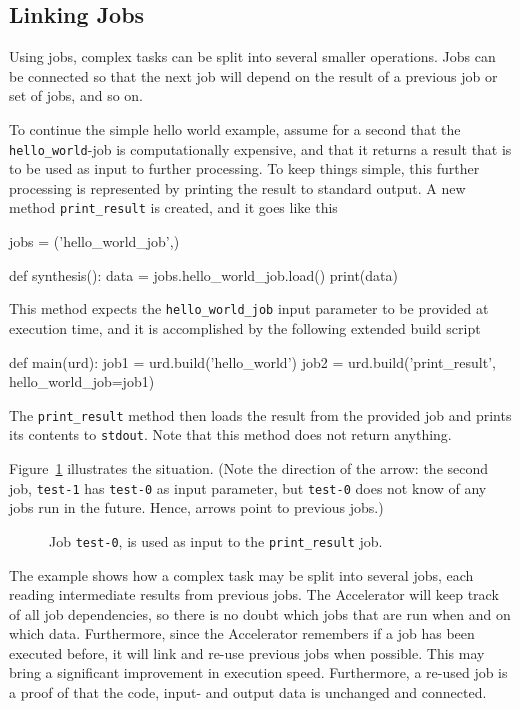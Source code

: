 \subsection{Linking Jobs}

Using jobs, complex tasks can be split into several smaller
operations.  Jobs can be connected so that the next job will depend on
the result of a previous job or set of jobs, and so on.

To continue the simple hello world example, assume for a second that
the \texttt{hello\_world}-job is computationally expensive, and that
it returns a result that is to be used as input to further processing.
To keep things simple, this further processing is represented by
printing the result to standard output.  A new method
\texttt{print\_result} is created, and it goes like this
\begin{python}
jobs = ('hello_world_job',)

def synthesis():
    data = jobs.hello_world_job.load() 
    print(data)
\end{python}
This method expects the \texttt{hello\_world\_job} input parameter to
be provided at execution time, and it is accomplished by the following
extended build script
\begin{python}
def main(urd):
    job1 = urd.build('hello_world')
    job2 = urd.build('print_result', hello_world_job=job1)
\end{python}
The \texttt{print\_result} method then loads the result from the
provided job and prints its contents to \texttt{stdout}.  Note that
this method does not return anything.

Figure~\ref{fig:execflow-print-result} illustrates the situation.
(Note the direction of the arrow: the second job, \texttt{test-1} has
\texttt{test-0} as input parameter, but \texttt{test-0} does not know
of any jobs run in the future.  Hence, arrows point to previous jobs.)

\begin{figure}[b]
  \begin{center}
    
    \caption{Job \texttt{test-0}, is used as input to the
      \texttt{print\_result} job.}
    \label{fig:execflow-print-result}
  \end{center}
\end{figure}

The example shows how a complex task may be split into several jobs,
each reading intermediate results from previous jobs.  The Accelerator
will keep track of all job dependencies, so there is no doubt which
jobs that are run when and on which data.  Furthermore, since the
Accelerator remembers if a job has been executed before, it will link
and re-use previous jobs when possible.  This may bring a significant
improvement in execution speed.  Furthermore, a re-used job is a proof
of that the code, input- and output data is unchanged and connected.


